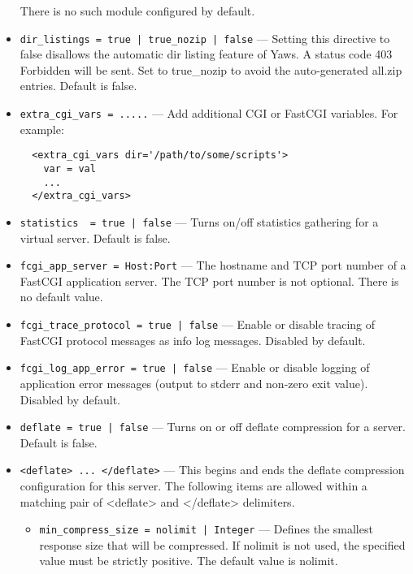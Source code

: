 \documentclass[11pt,oneside,english]{book}
\newcommand{\Yaws}            %
        {{\sc Yaws}}
\begin{document}
\begin{itemize}
              There is no such module configured by default.

\item       \verb+dir_listings = true | true_nozip | false+ ---
             Setting this directive to false disallows the automatic dir listing
             feature of \Yaws{}. A status code 403 Forbidden will be sent.  Set
             to true\_nozip to avoid the auto-generated all.zip entries. Default
             is false.

\item       \verb+extra_cgi_vars = .....+ ---
             Add additional CGI or FastCGI variables. For example:
\begin{verbatim}
  <extra_cgi_vars dir='/path/to/some/scripts'>
    var = val
    ...
  </extra_cgi_vars>
\end{verbatim}

\item       \verb+statistics  = true | false+ ---
             Turns on/off statistics gathering for a virtual server. Default is
             false.

\item       \verb+fcgi_app_server = Host:Port+ ---
             The hostname and TCP port number of a FastCGI application
             server. The TCP port number is not optional. There is no default
             value.

\item       \verb+fcgi_trace_protocol = true | false+ ---
             Enable or disable tracing of FastCGI protocol messages as info log
             messages. Disabled by default.

\item       \verb+fcgi_log_app_error = true | false+ ---
             Enable or disable logging of application error messages (output to
             stderr and non-zero exit value). Disabled by default.

\item       \verb+deflate = true | false+ ---
             Turns on or off deflate compression for a server. Default is
             false.

\item       \verb+<deflate> ... </deflate>+ ---
             This begins and ends the deflate compression configuration for this
             server. The following items are allowed within a matching pair of
             <deflate> and </deflate> delimiters.

             \begin{itemize}
             \item \verb+min_compress_size = nolimit | Integer+ --- Defines the
               smallest response size that will be compressed. If nolimit is not
               used, the specified value must be strictly positive. The default
               value is nolimit.


\end{itemize}
\end{itemize}
\end{document}
